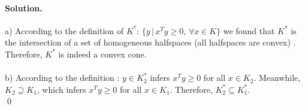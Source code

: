 \documentclass[a4paper]{article}
\newenvironment{solution}
{\color{blue} \paragraph{Solution.}}
{\newline \qed}
\begin{document}
\begin{solution}
    a) According to the definition of $K^*$: $\{  y\,|\,x^Ty \geq 0 ,\,\forall x \in K\}$ we found that $K^*$ is the intersection of a set of homogeneous halfspaces (all halfspaces are convex) . Therefore, $K^*$ is indeed a convex cone. \\
	\\b) According to the definition : $y \in K_2^*$ infers $x^Ty \geq 0$ for all $x \in K_2$. Meanwhile, $K_2 \supseteq K_1$, which infers $x^Ty \geq 0$ for all $x \in K_1$. Therefore, $K_2^* \subseteq K_1^*$. \\
\end{solution}
\end{document}
